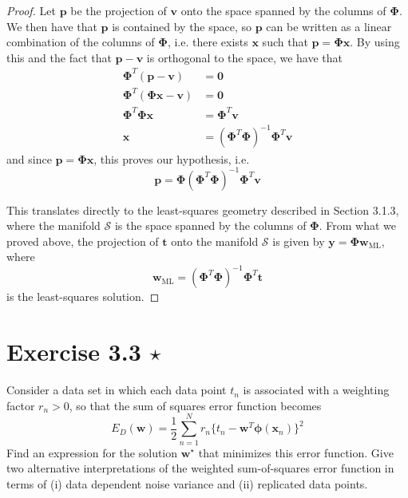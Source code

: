 \begin{proof}
    Let $\mathbf{p}$ be the projection of $\mathbf{v}$ onto the space spanned by the
    columns of $\mathbf{\Phi}$. We then have that $\mathbf{p}$ is contained by
    the space, so $\mathbf{p}$ can be written as a linear combination
    of the columns of $\mathbf{\Phi}$, i.e. there exists $\mathbf{x}$
    such that  $\mathbf{p} = \mathbf{\Phi}\mathbf{x}$. By using this
    and the fact that $\mathbf{p} - \mathbf{v}$ is orthogonal
    to the space, we have that
    \begin{align*}
        \mathbf{\Phi}^T(\mathbf{p} - \mathbf{v}) &= \mathbf{0} \\
        \mathbf{\Phi}^T(\mathbf{\Phi}\mathbf{x} - \mathbf{v}) &= \mathbf{0} \\
        \mathbf{\Phi}^T\mathbf{\Phi}\mathbf{x} &= \mathbf{\Phi}^T\mathbf{v} \\
        \mathbf{x} &= (\mathbf{\Phi}^T\mathbf{\Phi})^{-1}\mathbf{\Phi}^T\mathbf{v}
    \end{align*}
    and since $\mathbf{p} = \mathbf{\Phi}\mathbf{x}$, this proves our hypothesis,
    i.e. 
    \[
        \mathbf{p} = \mathbf{\Phi}(\mathbf{\Phi}^T\mathbf{\Phi})^{-1}\mathbf{\Phi}^T\mathbf{v}
    \] 

    This translates directly to the least-squares geometry described 
    in Section 3.1.3, where the manifold $\mathcal{S}$ is the space spanned
    by the columns of $\mathbf{\Phi}$. From what we proved above,
    the projection of $\mathbf{t}$ onto the manifold $\mathcal{S}$ 
    is given by $\mathbf{y} = \mathbf{\Phi}\mathbf{w}_{\text{ML}}$,
    where 
    \begin{equation*}
        \mathbf{w}_{\text{ML}} = (\mathbf{\Phi}^T \mathbf{\Phi})^{-1} \mathbf{\Phi}^T \mathbf{t}
        \tag{3.15}\label{eq:3.15}
    \end{equation*}
    is the least-squares solution.
\end{proof}

\section*{Exercise 3.3 $\star$}
Consider a data set in which each data point $t_n$ is associated with a weighting
factor $r_n > 0$, so that the sum of squares error function becomes
\begin{equation*}
    E_D(\mathbf{w}) = \frac{1}{2} \sum_{n=1}^{N} 
    r_n\{t_n - \mathbf{w}^T \bm{\phi}(\mathbf{x}_n)\}^2
    \tag{3.104}\label{eq:3.104}
\end{equation*}
Find an expression for the solution $\mathbf{w}^\star$ that minimizes this error function.
Give two alternative interpretations of the weighted sum-of-squares error function
in terms of (i) data dependent noise variance and (ii) replicated data points.

